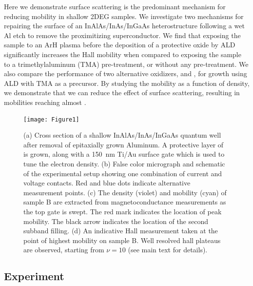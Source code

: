 Here we demonstrate surface scattering is the predominant mechanism for reducing mobility in shallow 2DEG samples. We investigate two mechanisms for repairing the surface of an  InAlAs/InAs/InGaAs heterostructure following a wet Al etch to remove the proximitizing superconductor. We find that exposing the sample to an ArH plasma before the deposition of a protective  oxide by ALD significantly increases the Hall mobility when compared to exposing the sample to a trimethylaluminum (TMA) pre-treatment, or without any pre-treatment. We also compare the performance of two alternative oxidizers,  and , for  growth using ALD with TMA as a precursor. By studying the mobility as a function of density, we demonstrate that we can reduce the effect of surface scattering, resulting in mobilities reaching almost .
\begin{figure}
\texttt{[image: Figure1]}
\caption[Schematic of InAs device, and measurement of density and mobility]{\label{fig:surf_fig1} (a) Cross section of a shallow InAlAs/InAs/InGaAs quantum well after removal of epitaxially grown Aluminum. A protective layer of  is grown, along with a \SI{150}{\nano\meter} Ti/Au surface gate which is used to tune the electron density. (b) False color micrograph and schematic of the experimental setup showing one combination of current and voltage contacts. Red and blue dots indicate alternative measurement points. (c) The density (violet) and mobility (cyan) of sample B are extracted from magnetoconductance measurements as the top gate is swept. The red mark indicates the location of peak mobility. The black arrow indicates the location of the second subband filling. (d) An indicative Hall measurement taken at the point of highest mobility on sample B. Well resolved hall plateaus are observed, starting from $\nu = 10$ (see main text for details).}
\end{figure}

\subsection{\label{sec:surf_exp}Experiment}


